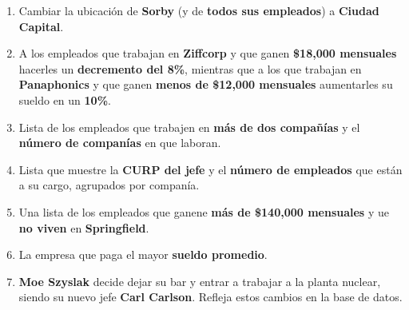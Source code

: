 \documentclass{article}
\begin{document}
\begin{enumerate}
{{\begin{enumerate}
{                        tienen por ciudad y por compañía.
                    }
                    \item {
                        Cambiar la ubicación de \textbf{Sorby} (y de 
                        \textbf{todos sus empleados}) a \textbf{Ciudad Capital}.
                    }
                    \item {
                        A los empleados que trabajan en \textbf{Ziffcorp} y que
                        ganen \textbf{\$18,000 mensuales} hacerles un
                        \textbf{decremento del 8\%}, mientras que a los que
                        trabajan en \textbf{Panaphonics} y que ganen 
                        \textbf{menos de \$12,000 mensuales} aumentarles su
                        sueldo en un \textbf{10\%}.
                    }
                    \item {
                        Lista de los empleados que trabajen en \textbf{más de
                        dos compañías} y el \textbf{número de companías} en que 
                        laboran.
                    }
                    \item {
                        Lista que muestre la \textbf{CURP del jefe} y el
                        \textbf{número de empleados} que están a su cargo,
                        agrupados por companía.
                    }
                    \item {
                        Una lista de los empleados que ganene \textbf{más de 
                        \$140,000 mensuales} y ue \textbf{no viven} en
                        \textbf{Springfield}.
                    }
                    \item {
                        La empresa que paga el mayor \textbf{sueldo promedio}.
                    }
                    \item {
                        \textbf{Moe Szyslak} decide dejar su bar y entrar a
                        trabajar a la planta nuclear, siendo su nuevo jefe
                        \textbf{Carl Carlson}. Refleja estos cambios en la base
                        de datos.
                    }
                \end{enumerate}
            }
        }
    \end{enumerate}
\end{document}
